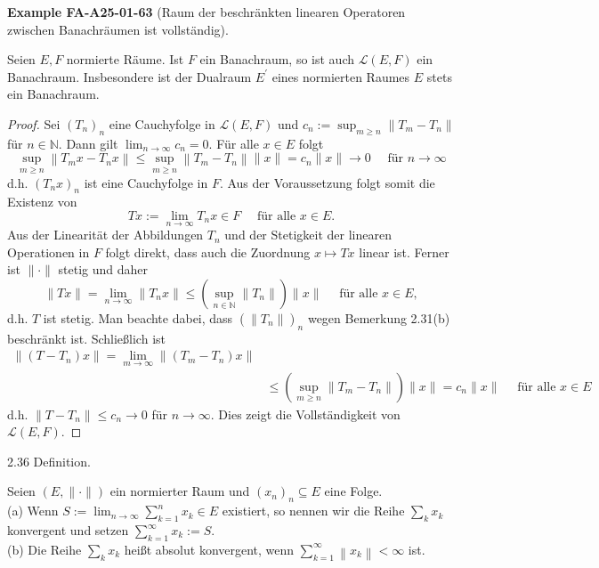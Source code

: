 \documentclass[10pt, letterpaper]{article}
\newcommand{\CustomHeading}[3]{%
  \par\medskip\noindent%
  \textbf{#1 #2} \textnormal{(#3)}.\enskip%
}
\newenvironment{EXA}[2]{\begin{unitbox}\CustomHeading{Example}{#1}{#2}}{\end{unitbox}}
\begin{document}
\begin{EXA}{FA-A25-01-63}{Raum der beschränkten linearen Operatoren zwischen Banachräumen ist vollständig}
Seien $E, F$ normierte Räume. Ist $F$ ein Banachraum, so ist auch $\mathcal{L}(E, F)$ ein Banachraum. Insbesondere ist der Dualraum $E^{\prime}$ eines normierten Raumes $E$ stets ein Banachraum.

\begin{proof} Sei $\left(T_{n}\right)_{n}$ eine Cauchyfolge in $\mathcal{L}(E, F)$ und $c_{n}:=\sup _{m \geq n}\left\|T_{m}-T_{n}\right\|$ für $n \in \mathbb{N}$. Dann gilt $\lim _{n \rightarrow \infty} c_{n}=0$. Für alle $x \in E$ folgt
$$
\sup _{m \geq n}\left\|T_{m} x-T_{n} x\right\| \leq \sup _{m \geq n}\left\|T_{m}-T_{n}\right\|\|x\|=c_{n}\|x\| \rightarrow 0 \quad \text { für } n \rightarrow \infty
$$
d.h. $\left(T_{n} x\right)_{n}$ ist eine Cauchyfolge in $F$. Aus der Voraussetzung folgt somit die Existenz von
$$
T x:=\lim _{n \rightarrow \infty} T_{n} x \in F \quad \text { für alle } x \in E .
$$
Aus der Linearität der Abbildungen $T_{n}$ und der Stetigkeit der linearen Operationen in $F$ folgt direkt, dass auch die Zuordnung $x \mapsto T x$ linear ist. Ferner ist $\|\cdot\|$ stetig und daher
$$
\|T x\|=\lim _{n \rightarrow \infty}\left\|T_{n} x\right\| \leq\left(\sup _{n \in \mathbb{N}}\left\|T_{n}\right\|\right)\|x\| \quad \text { für alle } x \in E,
$$
d.h. $T$ ist stetig. Man beachte dabei, dass $\left(\left\|T_{n}\right\|\right)_{n}$ wegen Bemerkung 2.31(b) beschränkt ist. Schließlich ist
$$
\begin{aligned}
\left\|\left(T-T_{n}\right) x\right\|=\lim _{m \rightarrow \infty}\left\|\left(T_{m}-T_{n}\right) x\right\| & \\
& \leq\left(\sup _{m \geq n}\left\|T_{m}-T_{n}\right\|\right)\|x\|=c_{n}\|x\| \quad \text { für alle } x \in E
\end{aligned}
$$
d.h. $\left\|T-T_{n}\right\| \leq c_{n} \rightarrow 0$ für $n \rightarrow \infty$. Dies zeigt die Vollständigkeit von $\mathcal{L}(E,F)$. \end{proof}
\end{EXA}



2.36 Definition. 

Seien $(E,\|\cdot\|)$ ein normierter Raum und $\left(x_{n}\right)_{n} \subseteq E$ eine Folge.\\
(a) Wenn $S:=\lim _{n \rightarrow \infty} \sum_{k=1}^{n} x_{k} \in E$ existiert, so nennen wir die Reihe $\sum_{k} x_{k}$ konvergent und setzen $\sum_{k=1}^{\infty} x_{k}:=S$.\\
(b) Die Reihe $\sum_{k} x_{k}$ heißt absolut konvergent, wenn $\sum_{k=1}^{\infty}\left\|x_{k}\right\|<\infty$ ist.\\
\end{document}
